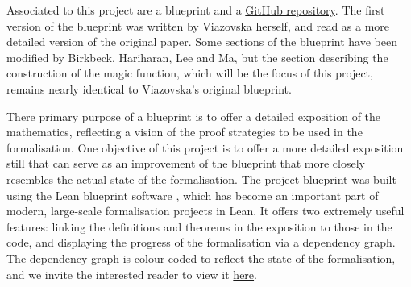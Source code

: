 Associated to this project are a blueprint \cite{blueprint} and a \href{https://github.com/thefundamentaltheor3m/Sphere-Packing-Lean}{GitHub repository}. The first version of the blueprint was written by Viazovska herself, and read as a more detailed version of the original paper. Some sections of the blueprint have been modified by Birkbeck, Hariharan, Lee and Ma, but the section describing the construction of the magic function, which will be the focus of this project, remains nearly identical to Viazovska's original blueprint.

There primary purpose of a blueprint is to offer a detailed exposition of the mathematics, reflecting a vision of the proof strategies to be used in the formalisation. One objective of this project is to offer a more detailed exposition still that can serve as an improvement of the blueprint that more closely resembles the actual state of the formalisation. The project blueprint was built using the Lean blueprint software \cite{Leanblueprint}, which has become an important part of modern, large-scale formalisation projects in Lean. It offers two extremely useful features: linking the definitions and theorems in the exposition to those in the code, and displaying the progress of the formalisation via a dependency graph. The dependency graph is colour-coded to reflect the state of the formalisation, and we invite the interested reader to view it \href{https://thefundamentaltheor3m.github.io/Sphere-Packing-Lean/blueprint/dep_graph_document.html}{here}.